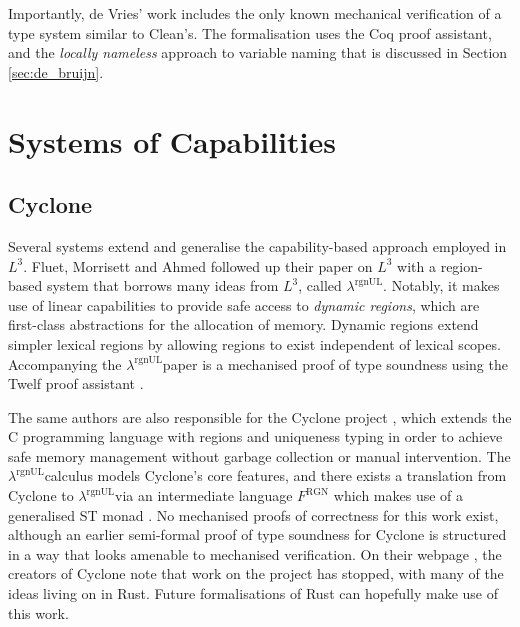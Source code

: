 \documentclass[]{unswthesis}
\newcommand{\rgnUL}{$\lambda^\text{rgnUL}$\text{ }}
\let\i\textit
\begin{document}
Importantly, de Vries' work includes the only known mechanical verification of a type system similar to Clean's. The formalisation uses the Coq proof assistant, and the \i{locally nameless} approach to variable naming that is discussed in Section \ref{sec:de_bruijn}.




\section{Systems of Capabilities}

\subsection{Cyclone}

Several systems extend and generalise the capability-based approach employed in $L^3$. Fluet, Morrisett and Ahmed followed up their paper on $L^3$ with a region-based system that borrows many ideas from $L^3$, called \rgnUL \cite{fluet06}. Notably, it makes use of linear capabilities to provide safe access to \i{dynamic regions}, which are first-class abstractions for the allocation of memory. Dynamic regions extend simpler lexical regions by allowing regions to exist independent of lexical scopes. Accompanying the \rgnUL paper is a mechanised proof of type soundness using the Twelf proof assistant \cite{pfenning99}.

The same authors are also responsible for the Cyclone project \cite{grossman05}, which extends the C programming language with regions and uniqueness typing in order to achieve safe memory management without garbage collection or manual intervention. The \rgnUL calculus models Cyclone's core features, and there exists a translation from Cyclone to \rgnUL via an intermediate language $F^\text{RGN}$ which makes use of a generalised ST monad \cite{fluet06, fluet04}. No mechanised proofs of correctness for this work exist, although an earlier semi-formal proof of type soundness for Cyclone \cite{jim01} is structured in a way that looks amenable to mechanised verification. On their webpage \cite{cycloneWeb}, the creators of Cyclone note that work on the project has stopped, with many of the ideas living on in Rust. Future formalisations of Rust can hopefully make use of this work.
\end{document}
